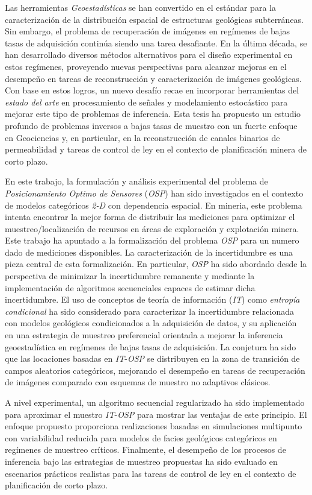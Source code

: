 Las herramientas \emph{Geoestadísticas} se han convertido en el estándar para la caracterización de la distribución espacial de estructuras geológicas subterráneas. Sin embargo, el problema de recuperación de imágenes en regímenes de bajas tasas de adquisición continúa siendo una tarea desafiante. En la última década, se han desarrollado diversos métodos alternativos para el diseño experimental en estos regímenes, proveyendo nuevas perspectivas para alcanzar mejoras en el desempeño en tareas de reconstrucción y caracterización de imágenes geológicas. Con base en estos logros, un nuevo desafío recae en incorporar herramientas del \emph{estado del arte} en procesamiento de señales y modelamiento estocástico para mejorar este tipo de problemas de inferencia. Esta tesis ha propuesto un estudio profundo de problemas inversos a bajas tasas de muestro con un fuerte enfoque en Geociencias y, en particular, en la reconstrucción de canales binarios de permeabilidad y tareas de control de ley en el contexto de planificación minera de corto plazo.

En este trabajo, la formulación y análisis experimental del problema de \emph{Posicionamiento Optimo de Sensores} (\emph{OSP}) han sido investigados en el contexto de modelos categóricos \emph{2-D} con dependencia espacial. En mineria, este problema intenta encontrar la mejor forma de distribuir las mediciones para optimizar el muestreo/localización de recursos en áreas de exploración y explotación minera. Este trabajo ha apuntado a la formalización del problema {\emph{OSP}} para un numero dado de mediciones disponibles. La caracterización de la incertidumbre es una pieza central de esta formalización. En particular, \emph{OSP} ha sido abordado desde la perspectiva de minimizar la incertidumbre remanente y mediante la implementación de algoritmos secuenciales capaces de estimar dicha incertidumbre. 
El uso de conceptos de teoría de información (\emph{IT}) como \emph{entropía condicional} ha sido considerado para caracterizar la incertidumbre relacionada con modelos geológicos condicionados a la adquisición de datos, y su aplicación en una estrategia de muestreo preferencial orientada a mejorar la inferencia geoestadística en regímenes de bajas tasas de adquisición. La conjetura ha sido que las locaciones basadas en \emph{IT}-\emph{OSP} se distribuyen en la zona de transición de campos aleatorios categóricos, mejorando el desempeño en tareas de recuperación de imágenes comparado con esquemas de muestro no adaptivos clásicos.

A nivel experimental, un algoritmo secuencial regularizado ha sido implementado para aproximar el muestro \emph{IT}-\emph{OSP} para mostrar las ventajas de este principio. El enfoque propuesto proporciona realizaciones basadas en simulaciones multipunto con variabilidad reducida para modelos de facies geológicos categóricos en regímenes de muestreo críticos. Finalmente, el desempeño de los procesos de inferencia bajo las estrategias de muestreo propuestas ha sido evaluado en escenarios prácticos realistas para las tareas de control de ley en el contexto de planificación de corto plazo.

